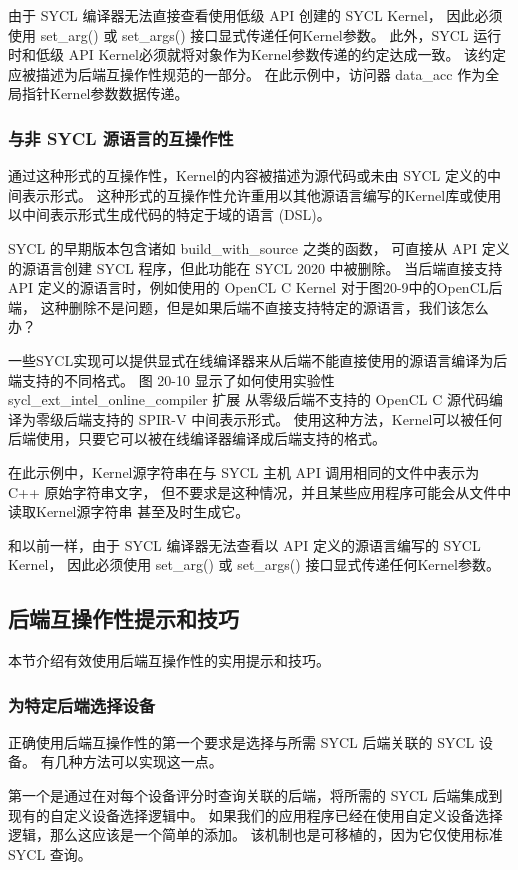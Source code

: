 由于 SYCL 编译器无法直接查看使用低级 API 创建的 SYCL Kernel，
因此必须使用 set\_arg() 或 set\_args() 接口显式传递任何Kernel参数。 
此外，SYCL 运行时和低级 API Kernel必须就将对象作为Kernel参数传递的约定达成一致。 
该约定应被描述为后端互操作性规范的一部分。 在此示例中，访问器 data\_acc 作为全局指针Kernel参数数据传递。

\subsubsection{与非 SYCL 源语言的互操作性}
通过这种形式的互操作性，Kernel的内容被描述为源代码或未由 SYCL 定义的中间表示形式。 
这种形式的互操作性允许重用以其他源语言编写的Kernel库或使用以中间表示形式生成代码的特定于域的语言 (DSL)。

SYCL 的早期版本包含诸如 build\_with\_source 之类的函数，
可直接从 API 定义的源语言创建 SYCL 程序，但此功能在 SYCL 2020 中被删除。
当后端直接支持 API 定义的源语言时，例如使用的 OpenCL C Kernel 对于图20-9中的OpenCL后端，
这种删除不是问题，但是如果后端不直接支持特定的源语言，我们该怎么办？

一些SYCL实现可以提供显式在线编译器来从后端不能直接使用的源语言编译为后端支持的不同格式。 
图 20-10 显示了如何使用实验性 sycl\_ext\_intel\_online\_compiler 扩展
从零级后端不支持的 OpenCL C 源代码编译为零级后端支持的 SPIR-V 中间表示形式。 
使用这种方法，Kernel可以被任何后端使用，只要它可以被在线编译器编译成后端支持的格式。

在此示例中，Kernel源字符串在与 SYCL 主机 API 调用相同的文件中表示为 C++ 原始字符串文字，
但不要求是这种情况，并且某些应用程序可能会从文件中读取Kernel源字符串 甚至及时生成它。

和以前一样，由于 SYCL 编译器无法查看以 API 定义的源语言编写的 SYCL Kernel，
因此必须使用 set\_arg() 或 set\_args() 接口显式传递任何Kernel参数。

\subsection{后端互操作性提示和技巧}
本节介绍有效使用后端互操作性的实用提示和技巧。

\subsubsection{为特定后端选择设备}
正确使用后端互操作性的第一个要求是选择与所需 SYCL 后端关联的 SYCL 设备。 
有几种方法可以实现这一点。

第一个是通过在对每个设备评分时查询关联的后端，将所需的 SYCL 后端集成到现有的自定义设备选择逻辑中。 
如果我们的应用程序已经在使用自定义设备选择逻辑，那么这应该是一个简单的添加。 
该机制也是可移植的，因为它仅使用标准 SYCL 查询。

